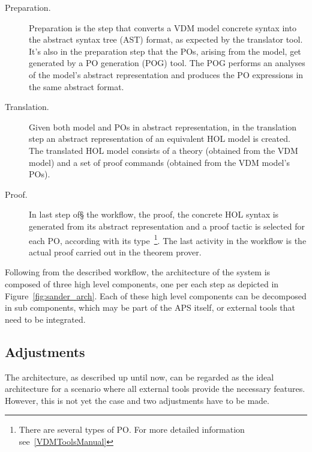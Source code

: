 \documentclass[]{article}
\begin{document}
\begin{description}
  \item[Preparation.] Preparation is the step that converts a VDM model concrete syntax into the abstract syntax tree (AST) format, as expected by the translator tool.
It's also in the preparation step that the POs, arising from the model, get generated by a PO generation (POG) tool.
The POG performs an analyses of the model's abstract representation and produces the PO expressions in the same abstract format.

  \item[Translation.] Given both model and POs in abstract representation, in the translation step an abstract representation of an equivalent HOL model is created. 
	The translated HOL model consists of a theory (obtained from the VDM model) and a set of proof commands (obtained from the VDM model's POs).

  \item[Proof.] In last step of§ the workflow, the proof, the concrete HOL syntax is generated from its abstract representation and a proof tactic is selected for each PO, according with its type~\footnote{There are several types of PO. For more detailed information see~\ref{VDMToolsManual}}. The last activity in the workflow is the actual proof carried out in the theorem prover.
\end{description}

Following from the described workflow, the architecture of the system is composed of three high level components, one per each step as depicted in Figure~\ref{fig:sander_arch}.
Each of these high level components can be decomposed in sub components, which may be part of the APS itself, or external tools that need to be integrated.


\subsection{Adjustments}
\label{sub:adjustments}

The architecture, as described up until now, can be regarded as the ideal architecture for a scenario where all external tools provide the necessary features.
However, this is not yet the case and two adjustments have to be made.
\end{document}

